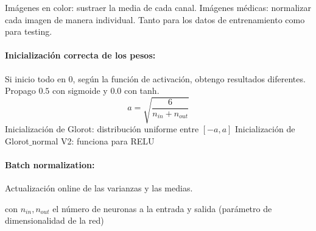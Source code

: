 \documentclass[12pt]{article}
\begin{document}
Imágenes en color: sustraer la media de cada canal. Imágenes médicas: normalizar cada imagen de manera individual. Tanto para los datos de entrenamiento como para testing.


\paragraph{Inicialización correcta de los pesos:} Si inicio todo en 0, según la función de activación, obtengo resultados diferentes. Propago $0.5$ con sigmoide y $0.0$ con tanh.
$$ a=\sqrt{ \frac{6}{n_{in}+n_{out}} } $$
Inicialización de Glorot: distribución uniforme entre $[-a,a]$
Inicialización de Glorot$\_$normal V2: funciona para RELU


\paragraph{Batch normalization:} Actualización online de las varianzas y las medias.

con $n_{in}, n_{out}$ el número de neuronas a la entrada y salida (parámetro de dimensionalidad de la red)
\end{document}
